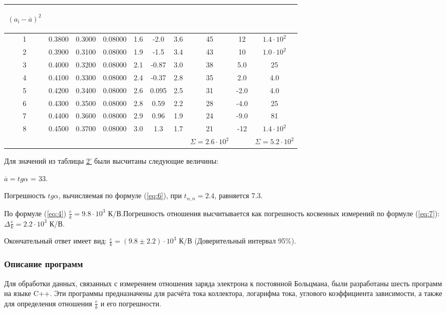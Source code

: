 \begin{center}
\begin{table}[H]
\begin{tabular}{|c|c|c|c|c|c|c|c|c|c|}
\begin{minipage}{20mm}
     \begin{center} $(a_{\text{i}}-\overline{a})^2$ \end{center}
\end{minipage}\\
\hline
1 & 0.3800 & 0.3000 & 0.08000 & 1.6 & -2.0  & 3.6 & 45 &  12  & $1.4\cdot10^2$ \\
2 & 0.3900 & 0.3100 & 0.08000 & 1.9 & -1.5  & 3.4 & 43 &  10  & $1.0\cdot10^2$ \\
3 & 0.4000 & 0.3200 & 0.08000 & 2.1 & -0.87 & 3.0 & 38 &  5.0 & 25             \\
4 & 0.4100 & 0.3300 & 0.08000 & 2.4 & -0.37 & 2.8 & 35 &  2.0 & 4.0            \\
5 & 0.4200 & 0.3400 & 0.08000 & 2.6 & 0.095 & 2.5 & 31 & -2.0 & 4.0            \\
6 & 0.4300 & 0.3500 & 0.08000 & 2.8 & 0.59  & 2.2 & 28 & -4.0 & 25             \\
7 & 0.4400 & 0.3600 & 0.08000 & 2.9 & 0.96  & 1.9 & 24 & -9.0 & 81             \\
8 & 0.4500 & 0.3700 & 0.08000 & 3.0 & 1.3   & 1.7 & 21 & -12  & $1.4\cdot10^2$ \\
\hline
 & & & & & & & $\Sigma=2.6\cdot10^2$ & & $\Sigma=5.2\cdot10^2$\\
\hline
\end{tabular}
\end{table}
\end{center}

Для значений из таблицы \hyperref[tabl:4]{2'} были высчитаны следующие величины:

$\overline{a}=tg{\alpha}$ = 33.

Погрешность $tg{\alpha}$, вычисляемая по формуле (\ref{eq:6}), при $t_{\alpha,n}=2.4$, равняется 7.3.

По формуле (\ref{eq:4}) $\frac{e}{k} = 9.8\cdot10^3$ К/В.Погрешность отношения высчитывается как погрешность косвенных измерений по формуле (\ref{eq:7}): $\Delta\frac{e}{k} = 2.2\cdot10^3$ К/В.

Окончательный ответ имеет вид: $\frac{e}{k} = (9.8 \pm2.2)\cdot10^3$ К/В (Доверительный интервал 95\%).

\subsubsection{Описание программ}

Для обработки данных, связанных с измерением отношения заряда электрона к постоянной Больцмана, были разработаны шесть программ на языке C++. Эти программы предназначены для расчёта тока коллектора, логарифма тока, углового коэффициента зависимости, а также для определения отношения $\frac{e}{k}$ и его погрешности.

